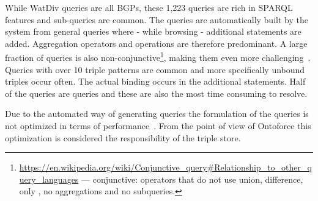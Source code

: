While WatDiv queries are all BGPs, these 1,223 queries are rich in SPARQL features and sub-queries are common.
The queries are automatically built by the system from general queries where - while browsing - additional  statements are added. 
Aggregation operators and  operations are therefore predominant. A large fraction of queries is also non-conjunctive\footnote{\scriptsize \url{https://en.wikipedia.org/wiki/Conjunctive_query\#Relationship_to_other_query_languages} --- conjunctive: operators that do not use union, difference, only , no aggregations and no subqueries.}, making them even more challenging~\cite{Picalausa2011}.
Queries with over 10 triple patterns are common and more specifically unbound triples occur often. The actual binding occurs in the additional  statements. Half of the queries are  queries and these are also the most time consuming to resolve. 

Due to the automated way of generating queries the formulation of the queries is not optimized in terms of performance~\cite{Groth}. From the point of view of Ontoforce this optimization is considered the responsibility of the triple store.

